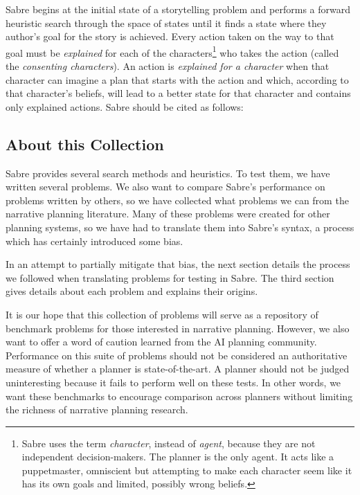 \documentclass{nilreport}
\makeatletter
\renewcommand{\bibentry}[1]{\nocite{#1}{\frenchspacing\@nameuse{BR@r@#1\@extra@b@citeb}}}
\makeatother
\begin{document}
Sabre begins at the initial state of a storytelling problem and performs
a forward heuristic search through the space of states until it finds
a state where they author's goal for the story is achieved. Every
action taken on the way to that goal must be \emph{explained} for
each of the characters\footnote{Sabre uses the term \emph{character}, instead of \emph{agent}, because
they are not independent decision-makers. The planner is the
only agent. It acts like a puppetmaster, omniscient but attempting
to make each character seem like it has its own goals and limited,
possibly wrong beliefs.} who takes the action (called the \emph{consenting characters}). An
action is \emph{explained for a character} when that character can
imagine a plan that starts with the action and which, according to
that character's beliefs, will lead to a better state for that character
and contains only explained actions. Sabre should be cited as follows:

\begin{quote}
	\bibentry{ware2021sabre}
\end{quote}

\subsection{About this Collection}

Sabre provides several search methods and heuristics. To test them,
we have written several problems. We also want to compare Sabre's
performance on problems written by others, so we have collected what
problems we can from the narrative planning literature. Many of these
problems were created for other planning systems, so we have had to
translate them into Sabre's syntax, a process which has certainly
introduced some bias.

In an attempt to partially mitigate that bias, the next section details
the process we followed when translating problems for testing in Sabre.
The third section gives details about each problem and explains their
origins.

It is our hope that this collection of problems will serve as a repository
of benchmark problems for those interested in narrative planning.
However, we also want to offer a word of caution learned from the
AI planning community. Performance on this suite of problems should
not be considered an authoritative measure of whether a planner is
state-of-the-art. A planner should not be judged uninteresting because
it fails to perform well on these tests. In other words, we want these
benchmarks to encourage comparison across planners without limiting
the richness of narrative planning research.
\end{document}
